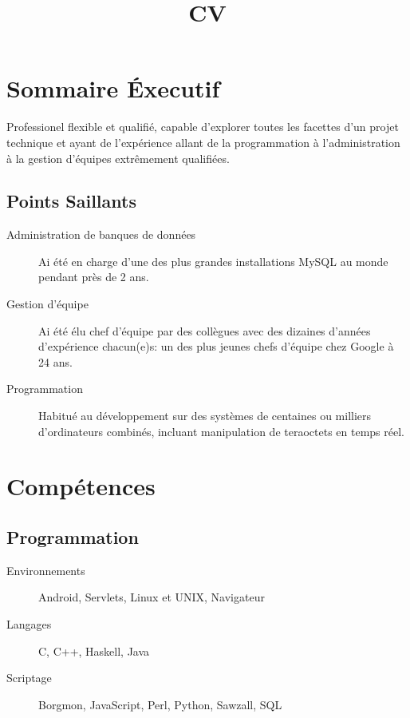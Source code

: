 \documentclass[10pt,letter,sans]{moderncv}   %
\title{CV}
\begin{document}
\makecvtitle

\section{Sommaire \'{E}xecutif}
Professionel flexible et qualifi\'{e}, capable d'explorer toutes les facettes d'un projet technique et ayant de l'exp\'{e}rience allant de la programmation \`{a} l'administration \`{a} la gestion d'\'{e}quipes extr\^{e}mement qualifi\'{e}es.

\subsection{Points Saillants}
\begin{description}
\item[Administration de banques de donn\'{e}es] Ai \'{e}t\'{e} en charge d'une des plus grandes installations MySQL au monde pendant pr\`{e}s de 2 ans.

\vspace{2 mm}

\item[Gestion d'\'{e}quipe] Ai \'{e}t\'{e} \'{e}lu chef d'\'{e}quipe par des coll\`{e}gues avec des dizaines d'ann\'{e}es d'exp\'{e}rience chacun(e)s: un des plus jeunes chefs d'\'{e}quipe chez Google \`{a} 24 ans.

\vspace{2 mm}

\item[Programmation] Habitu\'{e} au d\'{e}veloppement sur des syst\`{e}mes de centaines ou milliers d'ordinateurs combin\'{e}s, incluant manipulation de teraoctets en temps r\'{e}el.
\end{description}

\section{Comp\'{e}tences}
\subsection{Programmation}
\begin{description}
\item[Environnements] Android, Servlets, Linux et UNIX, Navigateur

\vspace{2 mm}

\item[Langages] C, C++, Haskell, Java

\vspace{2 mm}

\item[Scriptage] Borgmon, JavaScript, Perl, Python, Sawzall, SQL
\end{description}
\end{document}
